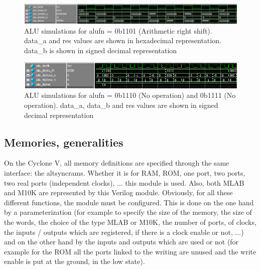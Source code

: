\begin{figure}[H]
    \centering
    \includegraphics[width=\linewidth]{Chapter3-CPU/res/alu_simu_3_2.PNG}
    \caption{ALU simulations for alufn = 0b1101 (Arithmetic right shift). data\_a and
    res values are shown in hexadecimal representation. data\_b is shown in signed decimal 
    representation}
    \label{fig:sim/alu_6}
\end{figure}

\begin{figure}[H]
    \centering
    \includegraphics[width=\linewidth]{Chapter3-CPU/res/alu_simu_4.PNG}
    \caption{ALU simulations for alufn = 0b1110 (No operation) and 0b1111 (No operation).
     data\_a, data\_b and res values are shown in signed decimal 
    representation}
    \label{fig:sim/alu_7}
\end{figure}

\subsection{Memories, generalities}

On the Cyclone V, all memory definitions are specified through the same interface: the altsyncrams. 
Whether it is for RAM, ROM, one port, two ports, two real ports (independent clocks), ... this 
module is used. Also, both MLAB and M10K are represented by this Verilog module. 
Obviously, for all these different functions, the module must be configured. This is done on 
the one hand by a parameterization (for example to specify the size of the memory, the size of the 
words, the choice of the type MLAB or M10K, the number of ports, of clocks, the inputs / outputs 
which are registered, if there is a clock enable or not, ...) and on the other hand by the inputs 
and outputs which are used or not (for example for the ROM all the ports linked to the writing are unused and the write enable is put at the ground, in the low state). 

